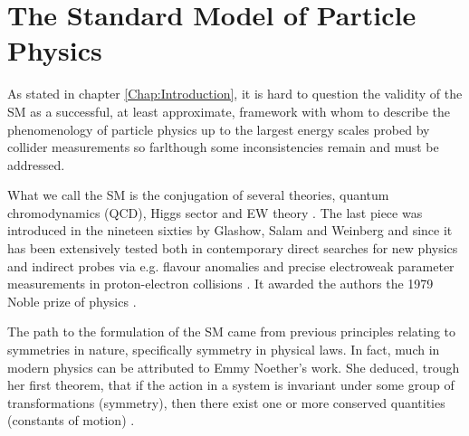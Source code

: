 
\chapter{The Standard Model of Particle Physics}
\label{Chap:SM}

%
%


As stated in chapter \ref{Chap:Introduction}, it is hard to question the validity of the SM as a successful, at least approximate, framework with whom to describe the phenomenology of particle physics up to the largest energy scales probed by collider measurements so farlthough some inconsistencies remain and must be addressed.  

What we call the SM is the conjugation of several theories, quantum chromodynamics (QCD), Higgs sector and   EW theory . The last piece was introduced in the nineteen sixties by Glashow, Salam and Weinberg \cite{SALAM1964168} and since it has been extensively tested both in contemporary direct searches for new physics and indirect probes via e.g. flavour anomalies and precise electroweak parameter measurements in proton-electron collisions \cite{Gr_newald_2008}. It awarded the authors the 1979 Noble prize of physics \cite{NobelPrize:2009-Physics}.  
%

The path to the formulation of the SM came from previous principles relating to symmetries in nature, specifically symmetry in physical laws. 
%
In fact, much in modern physics can be attributed to Emmy Noether's work. She deduced, trough her first theorem, that if the action in a system is invariant under some group of transformations (symmetry), then there exist one or more conserved quantities (constants of motion) \cite{doi:10.1080/00411457108231446}. 

